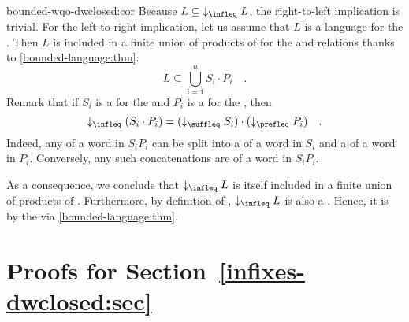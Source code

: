 \begin{proofof}{bounded-wqo-dwclosed:cor}
    Because $L \subseteq \dwset[\infleq]{L}$, the right-to-left implication
    is trivial.
    For the left-to-right implication, let us assume that $L$ is a
     language for the .
    Then $L$ is included in a finite union 
    of products of  for the  and  relations
    thanks to
    \cref{bounded-language:thm}:
    \begin{equation*}
        L \subseteq \bigcup_{i = 1}^n S_i \cdot P_i \quad .
    \end{equation*}
    Remark that if $S_i$ is a  for the 
    and $P_i$ is a  for the ,
    then 
    \begin{equation*}
      \dwset[\infleq]{(S_i \cdot P_i)} = (\dwset[\suffleq]{S_i}) \cdot (\dwset[\prefleq]{P_i})
        \quad .
    \end{equation*}
    Indeed, any  of a word in $S_i P_i$ can be split into
    a  of a word in $S_i$ and a  of a word in $P_i$.
    Conversely, any such concatenations are  of a word in $S_i P_i$.


    As a consequence, we conclude that $\dwset[\infleq]{L}$ is itself included
    in a finite union of products of .
    Furthermore, by definition of ,
    $\dwset[\infleq]{L}$ is also a .
    Hence, it is  by the  
    via
    \cref{bounded-language:thm}.
\end{proofof}


\section{Proofs for Section~\ref{infixes-dwclosed:sec}}


